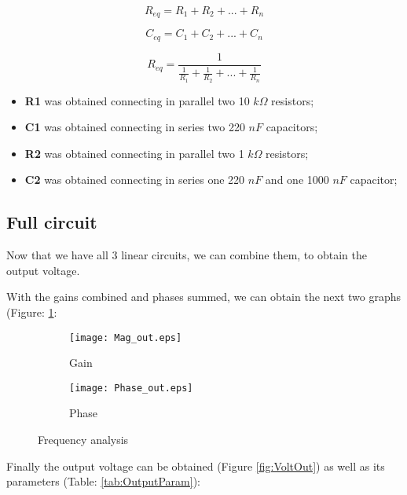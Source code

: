 \begin{equation}
    R_{eq}= R_1+R_2+...+R_n
    \label{eq:Rs}
\end{equation}

\begin{equation}
    C_{eq}= C_1+C_2+...+C_n
    \label{eq:Cp}
\end{equation}

\begin{equation}
    R_{eq}= \frac{1}{\frac{1}{R_1}+\frac{1}{R_2}+...+\frac{1}{R_n}}
    \label{eq:Rp}
\end{equation}

\begin{itemize}
    \item \textbf{R1} was obtained connecting in parallel two 10 $k\Omega$ resistors;
    \item \textbf{C1} was obtained connecting in series two 220 $nF$ capacitors;
    \item \textbf{R2} was obtained connecting in parallel two 1 $k\Omega$ resistors;
\item \textbf{C2} was obtained connecting in series one 220 $nF$ and one 1000 $nF$ capacitor;
\end{itemize}


\subsection{Full circuit}

\indent

Now that we have all 3 linear circuits, we can combine them, to obtain the output voltage.

With the gains combined and phases summed, we can obtain the next two graphs (Figure: \ref{fig:FreqA}:

\begin{figure}[H]
\centering
\begin{subfigure}{.49\textwidth}
  \centering
  \texttt{[image: Mag\_out.eps]}%
  \caption{Gain}
\end{subfigure}%
\begin{subfigure}{.49\textwidth}
  \centering
  \texttt{[image: Phase\_out.eps]}%
  \caption{Phase}
\end{subfigure}
\caption{Frequency analysis}
\label{fig:FreqA}
\end{figure}


Finally the output voltage can be obtained (Figure \ref{fig:VoltOut}) as well as its parameters (Table: \ref{tab:OutputParam}):

